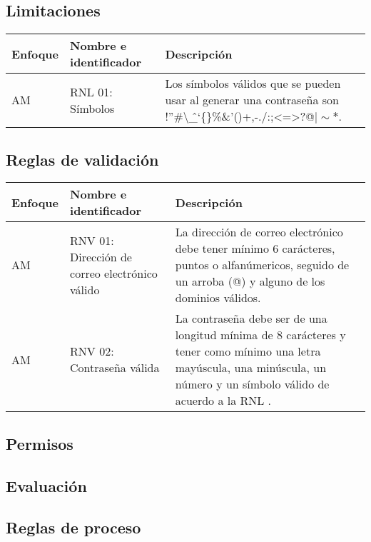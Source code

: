 \subsection{Limitaciones}
  \begin{center}
   \begin{tabular}{|p{2cm}|p{3.5cm}|p{7cm}|}
     \hline
       \textbf{Enfoque}&\textbf{Nombre e identificador} & \textbf{Descripción} \\ \hline
	\label{rnl_} AM & RNL 01: Símbolos & Los símbolos válidos que se pueden usar al generar una contraseña son !''\#\textbackslash\^\_`\{\}\textdollar\%\&'()+,-./:;<=>?@$\mid\sim\ast$. \\ \hline
   \end{tabular}
       \label{tab:rnl}
 \end{center}
 
\subsection{Reglas de validación}
  \begin{center}
   \begin{tabular}{|p{2cm}|p{3.5cm}|p{7cm}|}
     \hline
       \textbf{Enfoque}&\textbf{Nombre e identificador} & \textbf{Descripción} \\ \hline
	\label{rnv_01} AM & RNV 01: Dirección de correo electrónico válido  &  La dirección de correo electrónico debe tener mínimo 6 carácteres, puntos o alfanúmericos, seguido de un arroba (@) y alguno de los dominios válidos. \\ \hline
	\label{rnv_02} AM & RNV 02: Contraseña válida &  La contraseña debe ser de una longitud mínima de 8 carácteres y tener como mínimo una letra mayúscula, una minúscula, un número y un símbolo válido de acuerdo a la RNL . \\ \hline
   \end{tabular}
       \label{tab:rnv}
 \end{center}
 
\subsection{Permisos}

 \subsection{Evaluación}
 
 \subsection{Reglas de proceso}